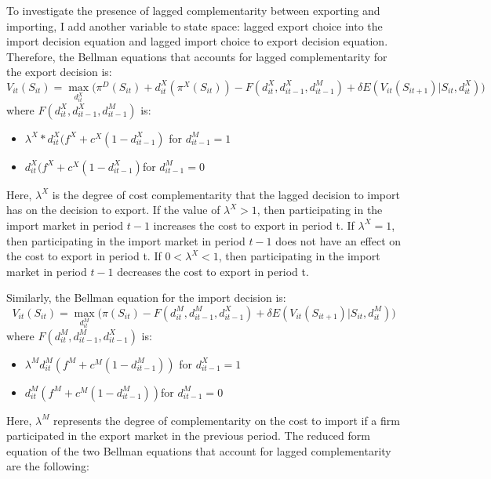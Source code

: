 \documentclass[12pt]{article}
\begin{document}
To investigate the presence of lagged complementarity between exporting and
importing, I add another variable to state space: lagged export
choice into the import decision equation and lagged import choice
to export decision equation. Therefore, the Bellman equations that
accounts for lagged complementarity for the export decision is: 
\begin{equation}
V_{it}(S_{it})= \underset{d_{it}^{X}}{\max} \Big(\pi^{D}(S_{it}) + d_{it}^{X}(\pi^{X}(S_{it})) - F(d_{it}^{X},d_{it-1}^{X}, d_{it-1}^{M})
  + \delta E (V_{it}(S_{it+1})|S_{it}, d_{it}^{X}) \Big)
\end{equation}
where $F(d_{it}^{X},d_{it-1}^{X}, d_{it-1}^{M})$ is: 
\begin{itemize}
\item $\lambda^{X} * d_{it}^{X}( f^{X} +c^{X}(1-d_{it-1}^{X})$ \hfill for
  $d_{it-1}^{M}= 1$
\item $d_{it}^{X}( f^{X} +c^{X}(1-d_{it-1}^{X})$\hfill for
  $d_{it-1}^{M}= 0$
\end{itemize}
Here, $\lambda^{X}$ is the degree of cost complementarity that the
lagged decision to import has on the decision to export. If the value
of $\lambda^{X} > 1$, then participating in the import market in
period $t-1$ increases the cost to export in period t. If
$\lambda^{X}=1$, then participating in the import market in
period $t-1$ does not have an effect on the cost to export in period t.
If $0<\lambda^{X}< 1$,     then participating in the import market in
period $t-1$ decreases the cost to export in period t.

Similarly, the Bellman equation for the import decision is: 
\begin{equation}
V_{it}(S_{it})= \underset{d_{it}^{M}}{\max}\big(\pi(S_{it}) - F(d_{it}^{M},d_{it-1}^{M}, d_{it-1}^{X})  + \delta E (V_{it}(S_{it+1})|S_{it}, d_{it}^{M})\Big)
\end{equation}
where $F(d_{it}^{M},d_{it-1}^{M}, d_{it-1}^{X})$ is: 
\begin{itemize}
\item $\lambda^{M}  d_{it}^{M}( f^{M} +c^{M}(1-d_{it-1}^{M}))$ \hfill for
  $d_{it-1}^{X}= 1$
\item $d_{it}^{M}( f^{M} +c^{M}(1-d_{it-1}^{M}))$\hfill for
  $d_{it-1}^{M}= 0$
\end{itemize}

Here, $\lambda^{M}$ represents the degree of complementarity on the
cost to import if a firm participated in
the export market in the previous period.  The reduced form
equation of the two Bellman equations that account for lagged
complementarity are the following:
\end{document}
